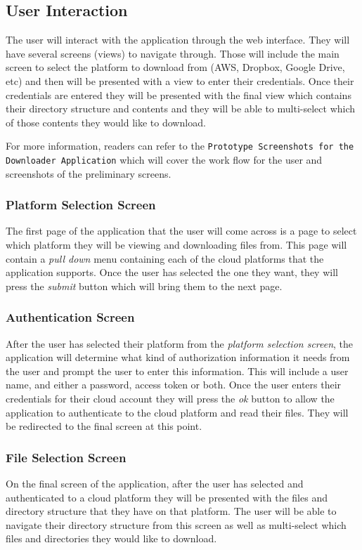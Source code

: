 \documentclass{article}
\begin{document}
    \subsection{User Interaction}
    The user will interact with the application through the web interface. They will have several screens (views)
    to navigate through. Those will include the main screen to select the platform to download from (AWS, Dropbox,
    Google Drive, etc) and then will be presented with a view to enter their credentials. Once their credentials
    are entered they will be presented with the final view which contains their directory structure and contents
    and they will be able to multi-select which of those contents they would like to download.

    For more information, readers can refer to the \texttt{Prototype Screenshots for the Downloader Application}\cite{prot}
    which will cover the work flow for the user and screenshots of the preliminary screens.
    
      \subsubsection{Platform Selection Screen}
      The first page of the application that the user will come across is a page to select which platform they will be
      viewing and downloading files from. This page will contain a \textit{pull down} menu containing each of the
      cloud platforms that the application supports. Once the user has selected the one they want, they will press the
      \textit{submit} button which will bring them to the next page.

      \subsubsection{Authentication Screen}
      After the user has selected their platform from the \textit{platform selection screen}, the application will
      determine what kind of authorization information it needs from the user and prompt the user to enter this information.
      This will include a user name, and either a password, access token or both. Once the user enters their credentials for
      their cloud account they will press the \textit{ok} button to allow the application to authenticate to the cloud platform
      and read their files. They will be redirected to the final screen at this point.
    
      \subsubsection{File Selection Screen}
      On the final screen of the application, after the user has selected and authenticated to a cloud platform they will be
      presented with the files and directory structure that they have on that platform. The user will be able to navigate their
      directory structure from this screen as well as multi-select which files and directories they would like to download.
\end{document}
